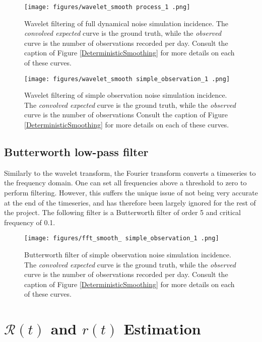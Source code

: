 \documentclass{article}
\newcommand{\nR}{\mathcal{R}}
\begin{document}
\clearpage
\begin{figure}[h!]
    \centering
    \texttt{[image: figures/wavelet\_smooth process\_1 .png]}
    \caption{Wavelet filtering of full dynamical noise simulation incidence. The \emph{convolved expected} curve is the ground truth, while the \emph{observed} curve is the number of observations recorded per day. Consult the caption of Figure \ref{DeterministicSmoothing} for more details on each of these curves.}
\end{figure}

\clearpage
\begin{figure}[h!]
    \centering
    \texttt{[image: figures/wavelet\_smooth simple\_observation\_1 .png]}
    \caption{Wavelet filtering of simple observation noise simulation incidence. The \emph{convolved expected} curve is the ground truth, while the \emph{observed} curve is the number of observations Consult the caption of Figure \ref{DeterministicSmoothing} for more details on each of these curves.}
\end{figure}



\subsection{Butterworth low-pass filter}
Similarly to the wavelet transform, the Fourier transform converts a timeseries to the frequency domain. One can set all frequencies above a threshold to zero to perform filtering. However, this suffers the unique issue of not being very accurate at the end of the timeseries, and has therefore been largely ignored for the rest of the project. The following filter is a Butterworth filter of order 5 and critical frequency of 0.1.

\clearpage
\begin{figure}[h!]
    \centering
    \texttt{[image: figures/fft\_smooth\_ simple\_observation\_1 .png]}
    \caption{Butterworth filter of simple observation noise simulation incidence. The \emph{convolved expected} curve is the ground truth, while the \emph{observed} curve is the number of observations recorded per day. Consult the caption of Figure \ref{DeterministicSmoothing} for more details on each of these curves.}
\end{figure}

\section {$\nR(t)$ and $r(t)$ Estimation}
\end{document}
